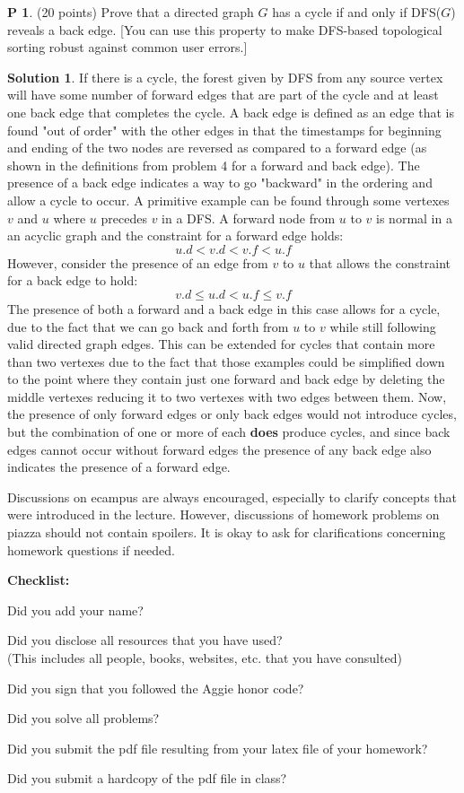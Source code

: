 \documentclass{article}
\theoremstyle{definition}
\newtheorem{problem}{P}
\newtheorem*{solution}{Solution}
\newcommand{\checklist}{\noindent\textbf{Checklist:}
\begin{compactitem}[$\Box$] 
\item Did you add your name? 
\item Did you disclose all resources that you have used? \\
(This includes all people, books, websites, etc. that you have consulted)
\item Did you sign that you followed the Aggie honor code? 
\item Did you solve all problems? 
\item Did you submit the pdf file resulting from your latex file 
  of your homework?
\item Did you submit a hardcopy of the pdf file in class? 
\end{compactitem}
}
\begin{document}
\begin{problem} (20 points)
Prove that a directed graph $G$ has a cycle if and only if DFS($G$)
reveals a back edge. [You can use this property to make DFS-based
topological sorting robust against common user errors.] 
 \end{problem}
\begin{solution}
If there is a cycle, the forest given by DFS from any source vertex will have some number of forward edges that are part of the cycle and at least one back edge that completes the cycle. A back edge is defined as an edge that is found "out of order" with the other edges in that the timestamps for beginning and ending of the two nodes are reversed as compared to a forward edge (as shown in the definitions from problem 4 for a forward and back edge). The presence of a back edge indicates a way to go "backward" in the ordering and allow a cycle to occur. A primitive example can be found through some vertexes $v$ and $u$ where $u$ precedes $v$ in a DFS. A forward node from $u$ to $v$ is normal in a an acyclic graph and the constraint for a forward edge holds:
$$ u.d < v.d < v.f < u.f $$
However, consider the presence of an edge from $v$ to $u$ that allows the constraint for a back edge to hold:
$$ v.d \leq u.d < u.f \leq v.f $$
The presence of both a forward and a back edge in this case allows for a cycle, due to the fact that we can go back and forth from $u$ to $v$ while still following valid directed graph edges. This can be extended for cycles that contain more than two vertexes due to the fact that those examples could be simplified down to the point where they contain just one forward and back edge by deleting the middle vertexes reducing it to two vertexes with two edges between them. Now, the presence of only forward edges or only back edges would not introduce cycles, but the combination of one or more of each \textbf{does} produce cycles, and since back edges cannot occur without forward edges the presence of any back edge also indicates the presence of a forward edge.
\end{solution}



Discussions on ecampus are always encouraged, especially to clarify
concepts that were introduced in the lecture. However, discussions of
homework problems on piazza should not contain spoilers. It is okay to
ask for clarifications concerning homework questions if needed. 
\medskip



\goodbreak
\checklist
\end{document}
